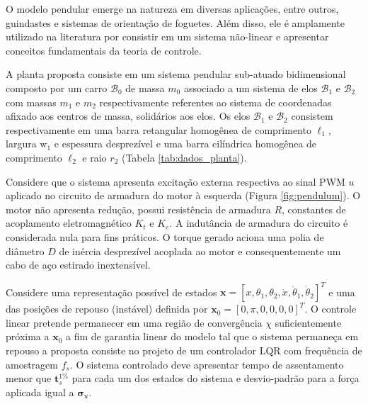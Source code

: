 \maketitle
    \thispagestyle{fancy}

    O modelo pendular emerge na natureza em diversas aplicações, entre outros, guindastes e sistemas de orientação de foguetes. Além disso, ele é amplamente utilizado na literatura por consistir em um sistema não-linear e apresentar conceitos fundamentais da teoria de controle. 
    
    A planta proposta consiste em um sistema pendular sub-atuado bidimensional composto por um carro $\mathcal{B}_0$ de massa $m_0$ associado a um sistema de elos $\mathcal{B}_1$ e $\mathcal{B}_2$ com massas $m_1$ e $m_2$ respectivamente referentes ao sistema de coordenadas afixado aos centros de massa, solidários aos elos. Os elos $\mathcal{B}_1$ e $\mathcal{B}_2$ consistem respectivamente em uma barra retangular homogênea de comprimento $\ell_1$, largura $\mathrm{w}_1$ e espessura desprezível e uma barra cilíndrica homogênea de comprimento $\ell_2$ e raio $r_2$ (Tabela \ref{tab:dados_planta}).
    
    
    
    Considere que o sistema apresenta excitação externa respectiva ao sinal PWM $u$ aplicado no circuito de armadura do motor à esquerda (Figura \ref{fig:pendulum}). O motor não apresenta redução, possui resistência de armadura $R$, constantes de acoplamento eletromagnético $K_t$ e $K_e$. A indutância de armadura do circuito é considerada nula para fins práticos. O torque gerado aciona uma polia de diâmetro $D$ de inércia desprezível acoplada ao motor e consequentemente um cabo de aço estirado inextensível.
    
    
        
    Considere uma representação possível de estados $\mathbf{x} = [x, \theta_1, \theta_2, \dot x, \dot \theta_1, \dot \theta_2]^T$ e uma das posições de repouso (instável) definida por $\mathbf{x}_{0} = [0, \pi, 0, 0, 0, 0]^T$. O controle linear pretende permanecer em uma região de convergência $\chi$ suficientemente próxima a $\mathbf{x}_{0}$ a fim de garantia linear do modelo \cite{Adamy2009} tal que o sistema permaneça em repouso a proposta consiste no projeto de um controlador LQR com frequência de amostragem $f_s$. O sistema controlado deve apresentar tempo de assentamento menor que $\mathbf{t}_s^{1\%}$ para cada um dos estados do sistema e desvio-padrão para a força aplicada igual a $\mathbf{\sigma}_u$. 
    
